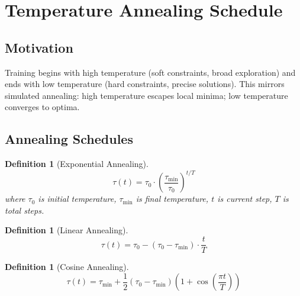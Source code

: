 \documentclass[11pt,a4paper]{article}
\newtheorem{definition}[theorem]{Definition}
\begin{document}
\section{Temperature Annealing Schedule}
\label{sec:annealing_chirho}

\subsection{Motivation}
\label{subsec:annealing_motivation_chirho}

Training begins with high temperature (soft constraints, broad exploration) and ends with low temperature (hard constraints, precise solutions).
This mirrors simulated annealing: high temperature escapes local minima; low temperature converges to optima.

\subsection{Annealing Schedules}
\label{subsec:schedules_chirho}

\begin{definition}[Exponential Annealing]
\label{def:exp_anneal_chirho}
\[
\tau(t) = \tau_0 \cdot \left(\frac{\tau_{\min}}{\tau_0}\right)^{t/T}
\]
where $\tau_0$ is initial temperature, $\tau_{\min}$ is final temperature, $t$ is current step, $T$ is total steps.
\end{definition}

\begin{definition}[Linear Annealing]
\label{def:linear_anneal_chirho}
\[
\tau(t) = \tau_0 - (\tau_0 - \tau_{\min}) \cdot \frac{t}{T}
\]
\end{definition}

\begin{definition}[Cosine Annealing]
\label{def:cosine_anneal_chirho}
\[
\tau(t) = \tau_{\min} + \frac{1}{2}(\tau_0 - \tau_{\min})\left(1 + \cos\left(\frac{\pi t}{T}\right)\right)
\]
\end{definition}
\end{document}
